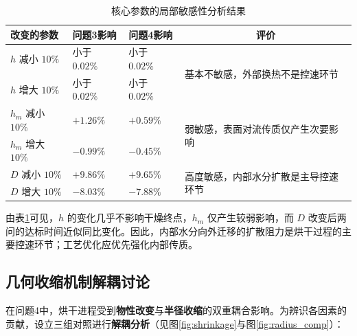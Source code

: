 \documentclass[12pt,a4paper,fontset=none]{ctexart}
\begin{document}
\begin{table}[H]
\centering
\caption{核心参数的局部敏感性分析结果}\label{tab:sensitivity}
\small
\setlength{\tabcolsep}{4pt}
\renewcommand{\arraystretch}{1.20}
\begin{tabular}{>{\centering\arraybackslash}p{2.6cm}
>{\centering\arraybackslash}p{2.7cm}
>{\centering\arraybackslash}p{2.7cm}p{5.2cm}}
\toprule
改变的参数 & 问题3影响 & 问题4影响 & \multicolumn{1}{c}{评价}\\
\midrule
$h$ 减小 $10\%$ & 小于 $0.02\%$ & 小于 $0.02\%$ &
\multirow{2}{5.2cm}{基本不敏感，外部换热不是控速环节}\\
\cmidrule(lr){1-3}
$h$ 增大 $10\%$ & 小于 $0.02\%$ & 小于 $0.02\%$ &\\
\midrule
$h_m$ 减小 $10\%$ & $+1.26\%$ & $+0.59\%$ &
\multirow{2}{5.2cm}{弱敏感，表面对流传质仅产生次要影响}\\
\cmidrule(lr){1-3}
$h_m$ 增大 $10\%$ & $-0.99\%$ & $-0.45\%$ &\\
\midrule
$D$ 减小 $10\%$ & $+9.86\%$ & $+9.65\%$ &
\multirow{2}{5.2cm}{高度敏感，内部水分扩散是主导控速环节}\\
\cmidrule(lr){1-3}
$D$ 增大 $10\%$ & $-8.03\%$ & $-7.88\%$ &\\
\bottomrule
\end{tabular}
\end{table}

由表\ref{tab:sensitivity}可见，$h$ 的变化几乎不影响干燥终点，$h_m$ 仅产生较弱影响，而 $D$ 改变后两问的达标时间近似同比变化。因此，内部水分向外迁移的扩散阻力是烘干过程的主要控速环节；工艺优化应优先强化内部传质。

\subsection{几何收缩机制解耦讨论}
\label{sec:mechanism_decoupling}
在问题4中，烘干进程受到\textbf{物性改变}与\textbf{半径收缩}的双重耦合影响。为辨识各因素的贡献，设立三组对照进行\textbf{解耦分析}（见图\ref{fig:shrinkage}与图\ref{fig:radius_comp}）：
\end{document}
